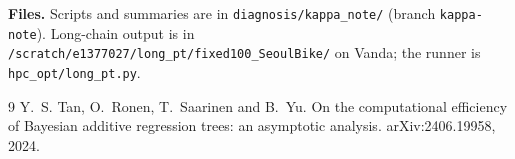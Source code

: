 \documentclass[11pt]{article}
\begin{document}
\textbf{Files.} Scripts and summaries are in \texttt{diagnosis/kappa\_note/} (branch \texttt{kappa-note}). Long-chain output is in \texttt{/scratch/e1377027/long\_pt/fixed100\_SeoulBike/} on Vanda; the runner is \texttt{hpc\_opt/long\_pt.py}.

\begin{thebibliography}{9}
Y.~S. Tan, O.~Ronen, T.~Saarinen and B.~Yu.
\newblock On the computational efficiency of Bayesian additive regression trees: an asymptotic analysis.
\newblock arXiv:2406.19958, 2024.
\end{thebibliography}
\end{document}
